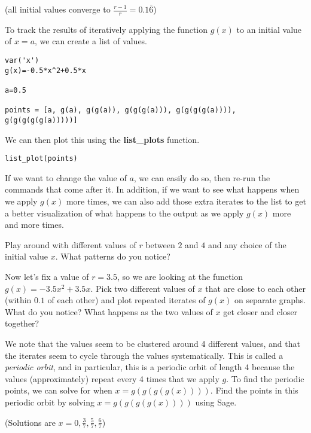 (all initial values converge to $\frac{r-1}{r}=0.1\bar{6}$)

To track the results of iteratively applying the function $g(x)$ to an initial
value of $x=a$, we can create a list of values.

\begin{verbatim}
var('x')
g(x)=-0.5*x^2+0.5*x

a=0.5

points = [a, g(a), g(g(a)), g(g(g(a))), g(g(g(g(a)))), g(g(g(g(g(a)))))]
\end{verbatim}

We can then plot this using the \textbf{list\_plots} function.

\begin{verbatim}
list_plot(points)
\end{verbatim}

If we want to change the value of $a$, we can easily do so, then re-run
the commands that come after it. In addition, if we want to see what
happens when we apply $g(x)$ more times, we can also add those
extra iterates to the list to get a better visualization of what happens
to the output as we apply $g(x)$ more and more times.

Play around with different values of $r$ between $2$ and $4$ and any
choice of the initial value $x$. What patterns do you notice?

Now let's fix a value of $r=3.5$, so we are looking at the function
$g(x)=-3.5x^2+3.5x$. Pick two different values of $x$ that are close to each other 
(within $0.1$ of each other) and plot repeated iterates of $g(x)$ on separate
graphs. What do you notice?
What happens as the two values of $x$ get closer and closer together?

We note that the values seem to be clustered around 4 different values,
and that the iterates seem to cycle through the values systematically. This is called
a \textit{periodic orbit}, and in particular, this is a periodic orbit of length 4 because
the values (approximately) repeat every 4 times that we apply $g$. To find
the periodic points, we can solve for when $x=g(g(g(g(x))))$. Find the points
in this periodic orbit by solving $x=g(g(g(g(x))))$ using Sage.

(Solutions are $x=0, \frac{3}{7}, \frac{5}{7}, \frac{6}{7}$)

